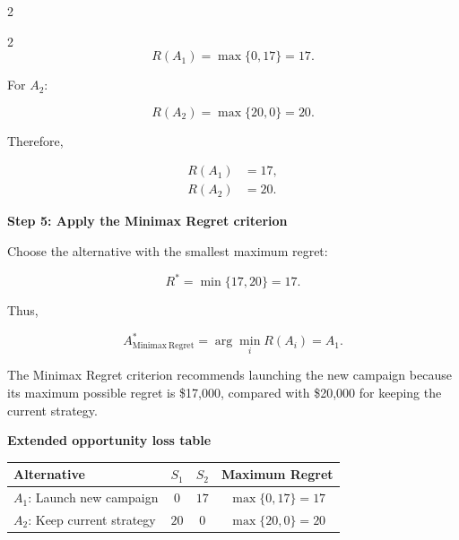 \begin{multicols}{2}
\begin{multicols}{2}
			\[
			R(A_1)
			=
			\max\{0,17\}
			=
			17.
			\]
			
			For $A_2$:
			
			\[
			R(A_2)
			=
			\max\{20,0\}
			=
			20.
			\]
			
			Therefore,
			
			\[
			\begin{aligned}
				R(A_1)&=17,\\
				R(A_2)&=20.
			\end{aligned}
			\]
			
			\textbf{Step 5: Apply the Minimax Regret criterion}
			
			Choose the alternative with the smallest maximum regret:
			
			\[
			R^*
			=
			\min\{17,20\}
			=
			17.
			\]
			
			Thus,
			
			\[
			A^*_{\mathrm{Minimax\ Regret}}
			=
			\arg\min_i R(A_i)
			=
			A_1.
			\]
			
			The Minimax Regret criterion recommends launching the new campaign
			because its maximum possible regret is \$17,000, compared with
			\$20,000 for keeping the current strategy.
			
		\end{multicols}
		
		\setlength{\columnseprule}{0pt}
		
		
		\textbf{Extended opportunity loss table}
		
		\begin{center}
			\small
			\renewcommand{\arraystretch}{1.5}
			\setlength{\tabcolsep}{5pt}
			
			\begin{tabular}{lccc}
				\toprule
				Alternative & $S_1$ & $S_2$ & Maximum Regret \\
				\midrule
				
				$A_1$: Launch new campaign
				& $0$
				& $17$
				& $\max\{0,17\}=17$
				\\
				
				$A_2$: Keep current strategy
				& $20$
				& $0$
				& $\max\{20,0\}=20$
				\\
				
				\bottomrule
			\end{tabular}
		\end{center}
		

\end{multicols}
